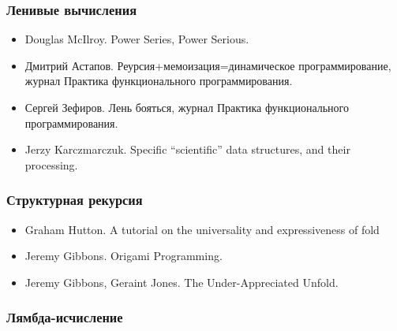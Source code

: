 \subsubsection{Ленивые вычисления}

\begin{itemize}
\item Douglas McIlroy. Power Series, Power Serious.

\item Дмитрий Астапов. Реурсия+мемоизация=динамическое программирование,
    журнал Практика функционального программирования.

\item Сергей Зефиров. Лень бояться, журнал Практика функционального
    программирования.

\item Jerzy Karczmarczuk. Specific “scientific” data structures, 
    and their processing.



\end{itemize}

\subsubsection{Структурная рекурсия}

\begin{itemize}
\item Graham Hutton. A tutorial on the universality
    and expressiveness of fold

\item Jeremy Gibbons. Origami Programming.

\item Jeremy Gibbons, Geraint Jones. The Under-Appreciated Unfold. 

\end{itemize}

\subsubsection{Лямбда-исчисление}

